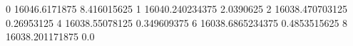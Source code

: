 0 16046.6171875 8.416015625
1 16040.240234375 2.0390625
2 16038.470703125 0.26953125
4 16038.55078125 0.349609375
6 16038.6865234375 0.4853515625
8 16038.201171875 0.0
